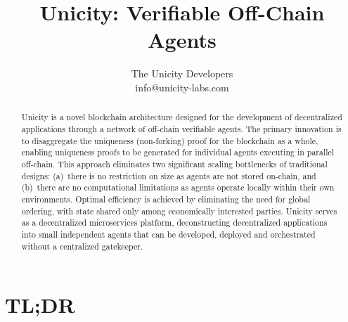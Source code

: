 \documentclass{article}
\title{Unicity: Verifiable Off-Chain Agents}
\author{The Unicity Developers\\info@unicity-labs.com}
\date{}
\begin{document}
\maketitle

\begin{abstract}

Unicity is a novel blockchain architecture designed for the development of decentralized applications through a network of off-chain verifiable agents. The primary innovation is to disaggregate the uniqueness (non-forking) proof for the blockchain as a whole, enabling uniqueness proofs to be generated for individual agents executing in parallel off-chain. This approach eliminates two significant scaling bottlenecks of traditional designs: (a)~there is no restriction on size as agents are not stored on-chain, and (b)~there are no computational limitations as agents operate locally within their own environments. Optimal efficiency is achieved by eliminating the need for global ordering, with state shared only among economically interested parties. Unicity serves as a decentralized microservices platform, deconstructing decentralized applications into small independent agents that can be developed, deployed and orchestrated without a centralized gatekeeper.

\end{abstract}

\section*{TL;DR}
\end{document}
